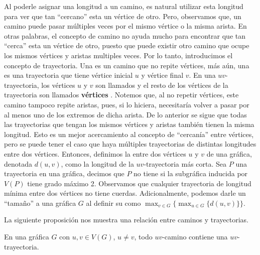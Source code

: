 Al poderle asignar una longitud a un camino, es natural utilizar esta longitud
para ver que tan ``cercano'' esta un v\'ertice de otro. Pero, observamos que, un
camino puede pasar m\'ultiples veces por el mismo v\'ertice o la misma arista.
En otras palabras, el concepto de camino no ayuda mucho para encontrar que tan
``cerca'' esta un v\'ertice de otro, puesto que puede existir otro camino que
ocupe los mismos v\'ertices y aristas multiples veces. Por lo tanto,
introducimos el concepto de trayectoria. Una  es un camino
que no repite v\'ertices, m\'as a\'un, una  es una
trayectoria que tiene v\'ertice inicial $u$ y v\'ertice final $v$. En una
$uv$-trayectoria, los v\'ertices $u$ y $v$ son llamados
 y el resto de los v\'ertices de la trayectoria
son llamados \textbf{v\'ertices} . Notemos que,
al no repetir v\'ertices, este camino tampoco repite aristas, pues, si lo
hiciera, necesitar\'ia volver a pasar por al menos uno de los extremos de dicha
arista. De lo anterior se sigue que todas las trayectorias que tengan los mismos
v\'ertices y aristas tambi\'en tienen la misma longitud. Esto es un mejor
acercamiento al concepto de ``cercan\'ia'' entre v\'ertices, pero se puede tener
el caso que haya m\'ultiples trayectorias de distintas longitudes entre dos
v\'ertices. Entonces, definimos la  entre dos v\'ertices $u$ y
$v$ de una gr\'afica, denotada $d(u,v)$, como la longitud de la $uv$-trayectoria
m\'as corta. Sea $P$ una trayectoria en una gr\'afica, decimos que $P$ no tiene
 si la subgr\'afica inducida por $V(P)$ tiene grado m\'aximo 2.
Observamos que cualquier trayectoria de longitud m\'inima entre dos v\'ertices
no tiene cuerdas. Adicionalmente, podemos darle un ``tama\~{n}o'' a una
gr\'afica $G$ al definir su  como $\max_{v\in G}\{\max_{u\in
G}\{d(u,v)\}\}$. 

La siguiente proposici\'on nos muestra una relaci\'on entre caminos y
trayectorias.  

\begin{proposicion}
\label{prop:CamTray}
    En una gr\'afica $G$ con $u, v \in V(G)$, $u \ne v$, todo $uv$-camino
    contiene una $uv$-trayectoria.
\end{proposicion}

